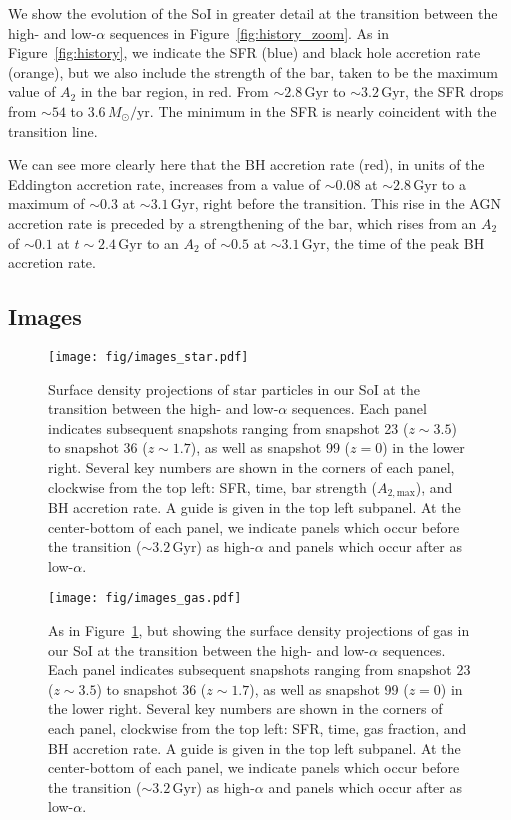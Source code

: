 \documentclass[linenumbers, twocolumn]{aastex631}
\newcommand{\Msun}{\ensuremath{M_{\odot}}}
\newcommand{\Gyr}{\ensuremath{\textrm{Gyr}}}
\newcommand{\Msunyr}{\ensuremath{\Msun/\textrm{yr}}}
\begin{document}
We show the evolution of the SoI in greater detail at the transition between the high- and low-$\alpha$ sequences in Figure~\ref{fig:history_zoom}. As in Figure~\ref{fig:history}, we indicate the SFR (blue) and black hole accretion rate (orange), but we also include the strength of the bar, taken to be the maximum value of $A_2$ in the bar region, in red. From $\sim2.8\,\Gyr$ to $\sim3.2\,\Gyr$, the SFR drops from $\sim54$ to $3.6\,\Msunyr$. The minimum in the SFR is nearly coincident with the transition line.

We can see more clearly here that the BH accretion rate (red), in units of the Eddington accretion rate, increases from a value of $\sim0.08$ at $\sim2.8\,\Gyr$ to a maximum of $\sim0.3$ at $\sim3.1\,\Gyr$, right before the transition. This rise in the AGN accretion rate is preceded by a strengthening of the bar, which rises from an $A_2$ of $\sim0.1$ at $t\sim2.4\,\Gyr$ to an $A_2$ of $\sim0.5$ at $\sim3.1\,\Gyr$, the time of the peak BH accretion rate.

\subsection{Images}\label{ssec:images}
\begin{figure*}
  \centering
  \texttt{[image: fig/images\_star.pdf]}
  \caption{Surface density projections of star particles in our SoI at the transition between the high- and low-$\alpha$ sequences. Each panel indicates subsequent snapshots ranging from snapshot 23 ($z\sim3.5$) to snapshot 36 ($z\sim1.7$), as well as snapshot 99 ($z=0$) in the lower right. Several key numbers are shown in the corners of each panel, clockwise from the top left: SFR, time, bar strength ($A_{2,\textrm{max}}$), and BH accretion rate. A guide is given in the top left subpanel. At the center-bottom of each panel, we indicate panels which occur before the transition ($\sim3.2\,\Gyr$) as high-$\alpha$ and panels which occur after as low-$\alpha$.}
  \label{fig:images_star}
\end{figure*}

\begin{figure*}
  \centering
  \texttt{[image: fig/images\_gas.pdf]}
  \caption{As in Figure~\ref{fig:images_star}, but showing the surface density projections of gas in our SoI at the transition between the high- and low-$\alpha$ sequences. Each panel indicates subsequent snapshots ranging from snapshot 23 ($z\sim3.5$) to snapshot 36 ($z\sim1.7$), as well as snapshot 99 ($z=0$) in the lower right. Several key numbers are shown in the corners of each panel, clockwise from the top left: SFR, time, gas fraction, and BH accretion rate. A guide is given in the top left subpanel. At the center-bottom of each panel, we indicate panels which occur before the transition ($\sim3.2\,\Gyr$) as high-$\alpha$ and panels which occur after as low-$\alpha$.}
  \label{fig:images_gas}
\end{figure*}
\end{document}
